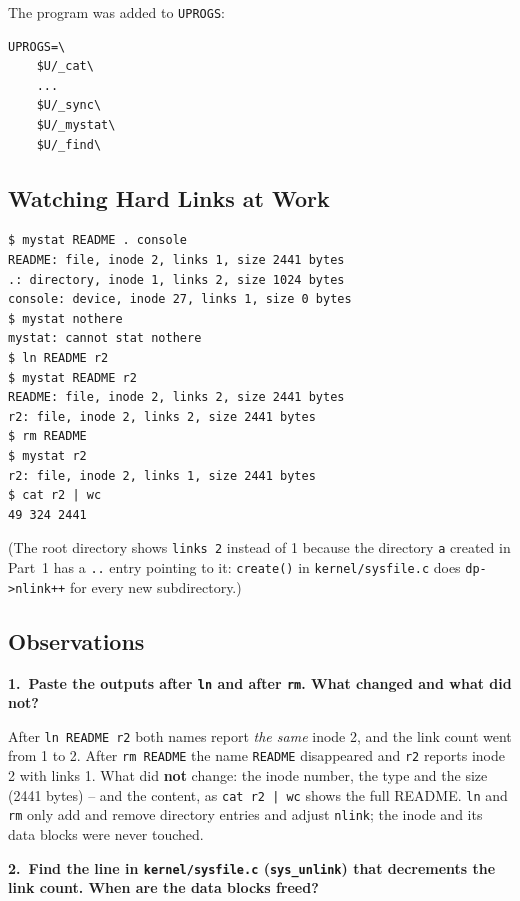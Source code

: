 \documentclass[12pt,a4paper]{article}
\newcommand{\qa}[2]{%
  \par\needspace{5\baselineskip}\medskip
  \noindent\textbf{#1.~#2}\par\smallskip\noindent}
\begin{document}
The program was added to \texttt{UPROGS}:

\begin{lstlisting}[style=terminal,caption={The new lines in UPROGS (each starts with a TAB)}]
UPROGS=\
	$U/_cat\
	...
	$U/_sync\
	$U/_mystat\
	$U/_find\
\end{lstlisting}

\subsection{Watching Hard Links at Work}

\begin{lstlisting}[style=terminal,caption={mystat before and after ln and rm}]
$ mystat README . console
README: file, inode 2, links 1, size 2441 bytes
.: directory, inode 1, links 2, size 1024 bytes
console: device, inode 27, links 1, size 0 bytes
$ mystat nothere
mystat: cannot stat nothere
$ ln README r2
$ mystat README r2
README: file, inode 2, links 2, size 2441 bytes
r2: file, inode 2, links 2, size 2441 bytes
$ rm README
$ mystat r2
r2: file, inode 2, links 1, size 2441 bytes
$ cat r2 | wc
49 324 2441
\end{lstlisting}

(The root directory shows \texttt{links 2} instead of 1 because the directory \texttt{a} created in Part~1 has a \texttt{..} entry pointing to it: \texttt{create()} in \texttt{kernel/sysfile.c} does \texttt{dp->nlink++} for every new subdirectory.)

\subsection*{Observations}

\qa{1}{Paste the outputs after \texttt{ln} and after \texttt{rm}. What changed and what did not?}
After \texttt{ln README r2} both names report \textit{the same} inode 2, and the link count went from 1 to 2. After \texttt{rm README} the name \texttt{README} disappeared and \texttt{r2} reports inode 2 with links 1. What did \textbf{not} change: the inode number, the type and the size (2441 bytes) -- and the content, as \texttt{cat r2 | wc} shows the full README. \texttt{ln} and \texttt{rm} only add and remove directory entries and adjust \texttt{nlink}; the inode and its data blocks were never touched.

\qa{2}{Find the line in \texttt{kernel/sysfile.c} (\texttt{sys\_unlink}) that decrements the link count. When are the data blocks freed?}
\end{document}
